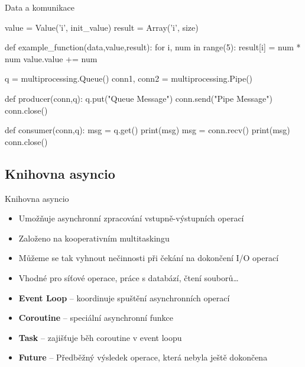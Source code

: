 \documentclass{beamer}
\begin{document}
\begin{frame}[fragile]{Data a komunikace}
    \scriptsize
    \begin{semiverbatim}
    value = Value('i', init_value)  
    result = Array('i', size)
    
    def example_function(data,value,result):  
        for i, num in range(5):  
            result[i] = num * num  
            value.value += num

    q = multiprocessing.Queue()
    conn1, conn2 = multiprocessing.Pipe()

    def producer(conn,q):
        q.put("Queue Message")
        conn.send("Pipe Message")
        conn.close()

    def consumer(conn,q):
        msg = q.get()
        print(msg)
        msg = conn.recv()
        print(msg)
        conn.close()
    \end{semiverbatim}
\end{frame}

\subsection{Knihovna asyncio}
\begin{frame}{Knihovna asyncio}
    \begin{itemize}
        \item Umožňuje asynchronní zpracování vstupně-výstupních operací
        \item Založeno na kooperativním multitaskingu
        \item Můžeme se tak vyhnout nečinnosti při čekání na dokončení I/O operací
        \item Vhodné pro síťové operace, práce s databází, čtení souborů…
        
        \vskip 0.35in
        \item \textbf{Event Loop} – koordinuje spuštění asynchronních operací
        \item \textbf{Coroutine} – speciální asynchronní funkce
        \item \textbf{Task} – zajišťuje běh coroutine v event loopu
        \item \textbf{Future} – Předběžný výsledek operace, která nebyla ještě dokončena
    \end{itemize}
\end{frame}
\end{document}
